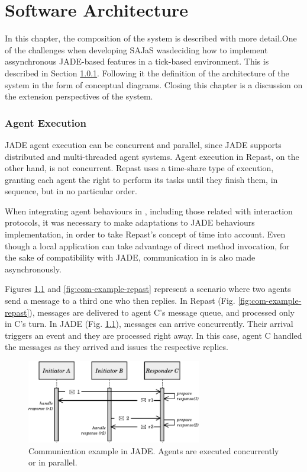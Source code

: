 \chapter{Software Architecture}
\label{chap:architecture}

In this chapter, the composition of the system is described with more detail.One of the challenges when developing SAJaS wasdeciding how to implement assynchronous JADE-based features in a tick-based environment. This is described in Section \ref{sec:agentexecution}. Following it the definition of the architecture of the system in the form of conceptual diagrams. Closing this chapter is a discussion on the extension perspectives of the system.

\subsection{Agent Execution}
\label{sec:agentexecution}

JADE agent execution can be concurrent and parallel, since JADE supports distributed and multi-threaded agent systems. Agent execution in Repast, on the other hand, is not concurrent. Repast uses a time-share type of execution, granting each agent the right to perform its tasks until they finish them, in sequence, but in no particular order.

When integrating agent behaviours in \apiname{}, including those related with interaction protocols, it was necessary to make adaptations to JADE behaviours implementation, in order to take Repast's concept of time into account. Even though a local application can take advantage of direct method invocation, for the sake of compatibility with JADE, communication in \apiname{} is also made asynchronously.

Figures \ref{fig:com-example-jade} and \ref{fig:com-example-repast} represent a scenario where two agents send a message to a third one who then replies. In Repast (Fig. \ref{fig:com-example-repast}), messages are delivered to agent C's message queue, and processed only in C's turn. In JADE (Fig. \ref{fig:com-example-jade}), messages can arrive concurrently. Their arrival triggers an event and they are processed right away. In this case, agent C handled the messages as they arrived and issues the respective replies.

\begin{figure}[h]
	\centering
	\includegraphics[width=3.0in]{figures/tickExample2.pdf}
	\caption{
		Communication example in JADE. Agents are executed concurrently or in parallel. 
	}
	\label{fig:com-example-jade}
\end{figure}

